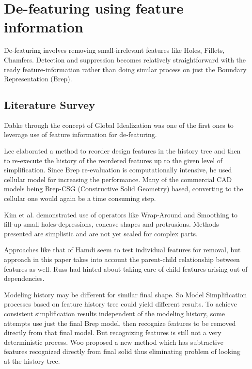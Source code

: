 \section{De-featuring using feature information}
	
	De-featuring involves removing small-irrelevant features like Holes, Fillets, Chamfers. Detection and suppression becomes relatively straightforward with the ready feature-information rather than doing similar process on just the Boundary Representation (Brep). 

\subsection{Literature Survey}

Dabke \citep{Dabke1994} through the concept of Global Idealization was one of the first ones to leverage use of feature information for de-featuring. 

	 Lee \citep{Lee2005} elaborated a method to reorder design features in the history tree and then to re-execute the history of the reordered features up to the given level of simplification. Since Brep re-evaluation is computationally intensive, he used cellular model for increasing the performance. Many of the commercial CAD models being Brep-CSG (Constructive Solid Geometry) based, converting to the cellular one would again be a time consuming step.

	Kim et al. \citep{Kim2005} demonstrated use of operators like Wrap-Around and Smoothing to fill-up small holes-depressions, concave shapes and protrusions. Methods presented are simplistic and are not yet scaled for complex parts.

Approaches like that of Hamdi \citep{Hamdi2005}  seem to test individual features for removal, but approach in this paper takes into account the parent-child relationship between features as well. Russ \citep{Russ2012} had hinted about taking care of child features arising out of dependencies. 

	Modeling history may be different for similar final shape. So Model Simplification processes based on feature history tree could yield different results. To achieve consistent simplification results independent of the modeling history, some attempts use just the final Brep model, then recognize features to be removed directly from that final model.  But recognizing features is still not a very deterministic process. Woo \citep{Woo2009} proposed a new method which has subtractive features recognized directly from final solid thus eliminating problem of looking at the history tree. 


